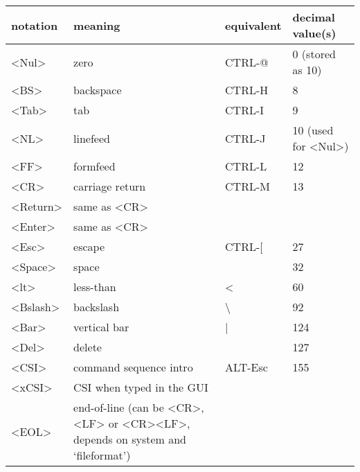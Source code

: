 \begin{description}
\begin{center}
\begin{tabularx}{\textwidth}{|l|X|l|l|}
				\hline
				notation & meaning                   & equivalent & decimal              value(s)\\ \hline
				<Nul>    & zero                      & CTRL-@     & 0 (stored as 10)     \label{<Nul>}\\
				<BS>     & backspace                 & CTRL-H     & 8                    \label{backspace}\\
				<Tab>    & tab                       & CTRL-I     & 9                    \label{tab} \label{Tab}\\
				<NL>     & linefeed                  & CTRL-J     & 10 (used for <Nul>)  \label{linefeed}\\
				<FF>     & formfeed                  & CTRL-L     & 12                   \label{formfeed}\\
				<CR>     & carriage return           & CTRL-M     & 13                   \label{carriage-return}\\
				<Return> & same as <CR>              &            &                      \label{<Return>}\\
				<Enter>  & same as <CR>              &            &                      \label{<Enter>}\\
				<Esc>    & escape                    & CTRL-[     & 27                   \label{escape} \label{<Esc>}\\
				<Space>  & space                     &            & 32                   \label{space}\\
				<lt>     & less-than                 & <          & 60                   \label{<lt>}\\
				<Bslash> & backslash                 & \textbackslash{}          & 92                   \label{backslash} \label{<Bslash>}\\
				<Bar>    & vertical bar              & |          & 124                  \label{<Bar>}\\
				<Del>    & delete                    &            & 127			 \\
				<CSI>    & command sequence intro    & ALT-Esc    & 155                  \label{<CSI>}\\
				<xCSI>   & CSI when typed in the GUI &            &                      \label{<xCSI>}\\

				<EOL> & end-of-line (can be <CR>, <LF> or <CR><LF>, depends on system and `fileformat') & &  \label{<EOL>}\\ %


\end{tabularx}
\end{center}
\end{description}
